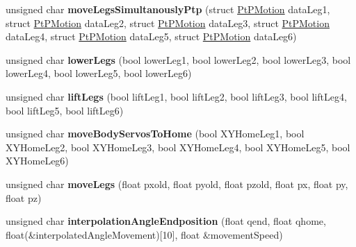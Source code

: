 \begin{DoxyCompactItemize}
\item 
\mbox{\label{class_movement_controller_a65f8976c91ea4870b364b3fdfea28cd9}} 
unsigned char {\bfseries move\+Legs\+Simultanously\+Ptp} (struct \mbox{\hyperlink{class_pt_p_motion}{Pt\+P\+Motion}} data\+Leg1, struct \mbox{\hyperlink{class_pt_p_motion}{Pt\+P\+Motion}} data\+Leg2, struct \mbox{\hyperlink{class_pt_p_motion}{Pt\+P\+Motion}} data\+Leg3, struct \mbox{\hyperlink{class_pt_p_motion}{Pt\+P\+Motion}} data\+Leg4, struct \mbox{\hyperlink{class_pt_p_motion}{Pt\+P\+Motion}} data\+Leg5, struct \mbox{\hyperlink{class_pt_p_motion}{Pt\+P\+Motion}} data\+Leg6)
\item 
\mbox{\label{class_movement_controller_aa4cf16451401486bd40e76e0e4b938f9}} 
unsigned char {\bfseries lower\+Legs} (bool lower\+Leg1, bool lower\+Leg2, bool lower\+Leg3, bool lower\+Leg4, bool lower\+Leg5, bool lower\+Leg6)
\item 
\mbox{\label{class_movement_controller_a667f9102c574d94b90a28ef3af2f08cb}} 
unsigned char {\bfseries lift\+Legs} (bool lift\+Leg1, bool lift\+Leg2, bool lift\+Leg3, bool lift\+Leg4, bool lift\+Leg5, bool lift\+Leg6)
\item 
\mbox{\label{class_movement_controller_a21beacef4336e370c4354f068a9fb502}} 
unsigned char {\bfseries move\+Body\+Servos\+To\+Home} (bool X\+Y\+Home\+Leg1, bool X\+Y\+Home\+Leg2, bool X\+Y\+Home\+Leg3, bool X\+Y\+Home\+Leg4, bool X\+Y\+Home\+Leg5, bool X\+Y\+Home\+Leg6)
\item 
\mbox{\label{class_movement_controller_a60394fc92c5874689cb4108f0d67a66a}} 
unsigned char {\bfseries move\+Legs} (float pxold, float pyold, float pzold, float px, float py, float pz)
\item 
\mbox{\label{class_movement_controller_a53b401947106872656c4fb1e77b04bba}} 
unsigned char {\bfseries interpolation\+Angle\+Endposition} (float qend, float qhome, float(\&interpolated\+Angle\+Movement)\mbox{[}10\mbox{]}, float \&movement\+Speed)
\item 
\mbox{\label{class_movement_controller_a12ad030f9459004052685722bc56acfb}} 

\end{DoxyCompactItemize}

